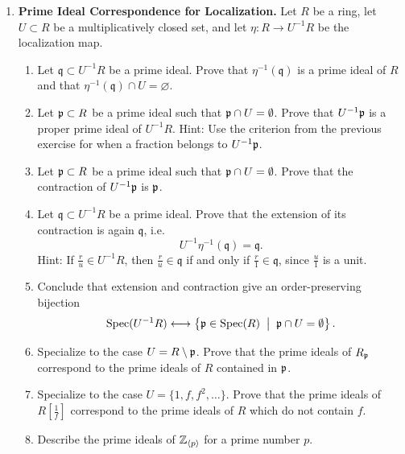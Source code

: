 \documentclass[12pt,reqno]{amsart}
\begin{document}
\begin{enumerate}[leftmargin=*,resume]
\item \textbf{Prime Ideal Correspondence for Localization.} Let $R$ be a ring, let $U\subset R$ be a multiplicatively closed set, and let $\eta:R\to U^{-1}R$ be the localization map.
\begin{enumerate}
	\item Let $\mathfrak{q}\subset U^{-1}R$ be a prime ideal. Prove that $\eta^{-1}(\mathfrak{q})$ is a prime ideal of $R$ and that $\eta^{-1}(\mathfrak{q})\cap U=\varnothing$.
	\item Let $\mathfrak{p}\subset R$ be a prime ideal such that $\mathfrak{p}\cap U=\emptyset$. Prove that $U^{-1}\mathfrak{p}$ is a proper prime ideal of $U^{-1}R$. Hint: Use the criterion from the previous exercise for when a fraction belongs to $U^{-1}\mathfrak{p}$.
	\item Let $\mathfrak{p}\subset R$ be a prime ideal such that $\mathfrak{p}\cap U=\emptyset$. Prove that the contraction of $U^{-1}\mathfrak{p}$ is $\mathfrak{p}$.
	\item Let $\mathfrak{q}\subset U^{-1}R$ be a prime ideal. Prove that the extension of its contraction is again $\mathfrak{q}$, i.e.
	\[
	U^{-1}\eta^{-1}(\mathfrak{q})=\mathfrak{q}.
	\]
	Hint: If $\frac{r}{u}\in U^{-1}R$, then $\frac{r}{u}\in \mathfrak{q}$ if and only if $\frac{r}{1}\in \mathfrak{q}$, since $\frac{u}{1}$ is a unit.
	\item Conclude that extension and contraction give an order-preserving bijection
	\[
	\operatorname{Spec}(U^{-1}R)
	\longleftrightarrow
	\left\{\mathfrak{p}\in \operatorname{Spec}(R)\;\; \big|\;\; \mathfrak{p}\cap U=\emptyset\right\}.
	\]
	\item Specialize to the case $U=R\setminus \mathfrak{p}$. Prove that the prime ideals of $R_{\mathfrak{p}}$ correspond to the prime ideals of $R$ contained in $\mathfrak{p}$.
	\item Specialize to the case $U=\{1,f,f^2,\ldots\}$. Prove that the prime ideals of $R[\frac{1}{f}]$ correspond to the prime ideals of $R$ which do not contain $f$.
	\item Describe the prime ideals of $\mathbb{Z}_{\langle p\rangle}$ for a prime number $p$.
\end{enumerate}
\end{enumerate}

\hrulefill
\end{document}
